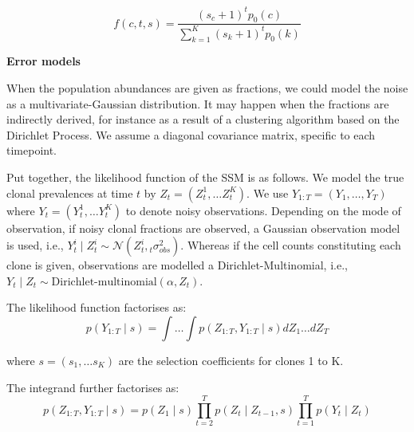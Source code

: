 \documentclass{article}
\begin{document}
\begin{equation} \label{eq:wfde}
    f(c,t,s) = \frac{(s_c+1)^t p_0(c) }{\sum_{k=1}^{K} (s_k+1)^t p_0(k) }
\end{equation}

\textbf{Error models}

\begin{comment}
We have considered two scenarios for the error models.
First, a sample of $N_t$ cells is taken from the tumour mass at timepoint $t$ and then partitioned into $K$ clones.
This is the case, for example, when the subpopulations are inferred by phylogenetic analysis; that is, when each clone is defined as a clade in the phylogenetic tree. 

\end{comment}

When the population abundances are given as fractions, we could model the noise as a multivariate-Gaussian distribution.
It may happen when the fractions are indirectly derived, for instance as a result of a clustering algorithm based on the Dirichlet Process.
We assume a diagonal covariance matrix, specific to each timepoint. 


Put together, the likelihood function of the SSM is as follows.
We model the true clonal prevalences at time $t$ by $Z_t = (Z_t^1, \ldots Z_t^K)$.
We use $Y_{1:T} = (Y_1, \ldots, Y_T)$ where $Y_t = (Y_t^1, \ldots Y_t^K)$ to denote noisy observations.
Depending on the mode of observation, if noisy clonal fractions are observed, a Gaussian observation model is used, i.e., $Y_t^i  \mid Z_t^i \sim \mathcal{N}(Z_t^i, {}_{t}\sigma_{obs}^2)$.
Whereas if the cell counts constituting each clone is given, observations are modelled a Dirichlet-Multinomial, i.e., $Y_t  \mid Z_t \sim \text{Dirichlet-multinomial}(\alpha, Z_t)$.


The likelihood function factorises as:
\begin{equation} \label{eq:likelihood}
p(Y_{1:T} \mid s) = \int \ldots \int p(Z_{1:T}, Y_{1:T} \mid s) dZ_1 \ldots dZ_T
\end{equation}

where $s = (s_1, \ldots s_K) $ are the selection coefficients for clones 1 to K.

The integrand further factorises as:
\begin{equation} \label{eq:likelihood1}
p(Z_{1:T}, Y_{1:T} \mid s) =   p(Z_1 \mid s) \prod_{t=2}^T p(Z_t \mid Z_{t-1}, s)  \prod_{t=1}^T p(Y_{t} \mid Z_t)
\end{equation}
\end{document}
